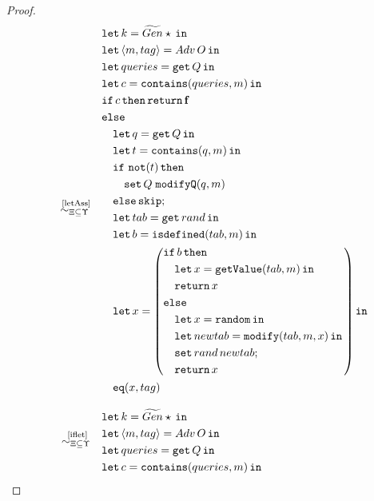 \begin{proof}
\footnotesize{
\begin{align*}
\quad\overset{\text{~\ref{letAss}}}{\simcontext}\quad&
\begin{aligned}
    &\letin{k = \widetilde{Gen} \star}{} \\
    &\letin{\lis{m,tag} = Adv\,O}{} \\
    &\letin{queries = \get Q}{} \\
    &\letin{c=\mathtt{contains}(queries, m)}{} \\
    &\mathtt{if}\, c\, \mathtt{then}\, \return \false \\
    &\mathtt{else}\\
    &\quad\letin{q=\get Q}{} \\
    &\quad\letin{t=\mathtt{contains}(q,m)}{} \\
    &\quad\mathtt{if}\ \mathtt{not}(t)\,\mathtt{then} \\
    &\quad\quad \mathtt{set}\,Q\;\mathtt{modifyQ}(q,m) \\
    &\quad\mathtt{else}\,\mathtt{skip}; \\
    &\quad\letin{tab = \mathtt{get}\,rand}{} \\
    &\quad\letin{b = \mathtt{isdefined}(tab, m)}{} \\
    &\quad\mathtt{let}\, x=\left(
    \begin{aligned}
        &\mathtt{if}\, b\, \mathtt{then} \\
        &\quad \letin{x = \mathtt{getValue}(tab, m)}{} \\
        &\quad \return x \\
        &\mathtt{else} \\
        &\quad \letin{x = \random}{} \\
        &\quad \letin{newtab = \mathtt{modify}(tab, m, x)}{} \\
        &\quad \mathtt{set}\,rand\,newtab; \\
        &\quad \return x
    \end{aligned}
    \right)\mathtt{in} \\
    &\quad\mathtt{eq}(x,tag)
\end{aligned}
\\[2ex]
\quad\overset{\text{~\ref{iflet}}}{\simcontext}\quad&
\begin{aligned}
    &\letin{k = \widetilde{Gen} \star}{} \\
    &\letin{\lis{m,tag} = Adv\,O}{} \\
    &\letin{queries = \get Q}{} \\
    &\letin{c=\mathtt{contains}(queries, m)}{} \\

\end{aligned}
\end{align*}}
\end{proof}
